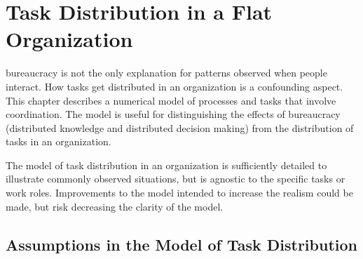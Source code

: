 \chapter{Task Distribution in a Flat Organization\label{sec:work-distribution}}

\Gls{bureaucracy} is not the only explanation for patterns observed when people interact. How tasks get distributed in an organization is a confounding aspect.  This chapter describes a numerical model of processes and tasks that involve coordination. 
The model is useful for distinguishing the effects of bureaucracy (distributed knowledge and distributed decision making) from the distribution of tasks in an organization.

The model of task distribution in an organization is sufficiently detailed to illustrate commonly observed situations, but is agnostic to the specific tasks or work roles. Improvements to the model intended to increase the realism could be made, but risk decreasing the clarity of the model.

\section{Assumptions in the Model of Task Distribution}

